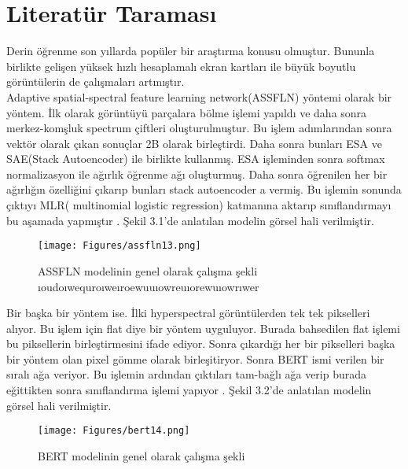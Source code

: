 \chapter{Literatür Taraması}

Derin öğrenme son yıllarda popüler bir araştırma konusu olmuştur. Bununla birlikte gelişen yüksek 
hızlı hesaplamalı ekran kartları ile büyük boyutlu görüntülerin de çalışmaları artmıştır.\\

Adaptive spatial-spectral feature learning network(ASSFLN) yöntemi olarak bir yöntem. İlk olarak görüntüyü parçalara bölme işlemi yapıldı ve daha sonra merkez-komşluk spectrum çiftleri oluşturulmuştur. Bu işlem adımlarından sonra vektör olarak çıkan sonuçlar 2B olarak birleştirdi. Daha sonra bunları ESA ve SAE(Stack Autoencoder) ile birlikte kullanmış. ESA işleminden sonra softmax normalizasyon ile ağırlık öğrenme ağı oluşturmuş. Daha sonra öğrenilen her bir ağırlığın özelliğini çıkarıp bunları  stack autoencoder a vermiş. Bu işlemin sonunda çıktıyı MLR( multinomial logistic regression) katmanına aktarıp sınıflandırmayı bu aşamada yapmıştır \cite{li2019adaptive}. Şekil 3.1'de anlatılan modelin görsel hali verilmiştir. \\

\begin{figure}[!ht]
  \centering
  \texttt{[image: Figures/assfln13.png]}
  \caption{ASSFLN modelinin genel olarak çalışma şekli ıoudoıwequroıweıroewuuıowreuıorewuıowrıwer }
\end{figure}

\newpage
Bir başka bir yöntem ise. İlki hyperspectral görüntülerden tek tek pikselleri alıyor. Bu işlem için flat diye bir yöntem uyguluyor. Burada bahsedilen flat işlemi bu piksellerin birleştirmesini ifade ediyor. Sonra çıkardığı her bir pikselleri  başka bir yöntem olan pixel gömme olarak birleşitiryor.  Sonra BERT ismi verilen bir sıralı ağa veriyor. Bu işlemin ardından çıktıları tam-bağlı ağa verip burada eğittikten sonra sınıflandırma işlemi yapıyor \cite{he2019hsi}. Şekil 3.2'de anlatılan modelin görsel hali verilmiştir. \\

\begin{figure}[!ht]
  \centering
  \texttt{[image: Figures/bert14.png]}
  \caption{BERT modelinin genel olarak çalışma şekli }
\end{figure}

